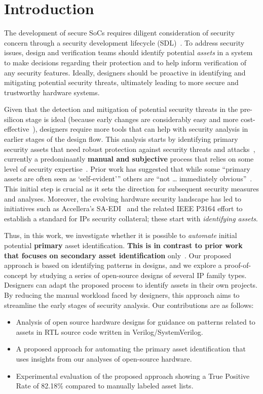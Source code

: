 \section{Introduction}

The development of secure \acp{SoC} requires diligent consideration of security concern through a security development lifecycle (SDL)~\cite{Khattri_HSDL_2012}. 
To address security issues, design and verification teams should identify potential \textit{assets} in a system to make decisions regarding their protection and to help inform verification of any security features. 
Ideally, designers should be proactive in identifying and mitigating potential security threats, ultimately leading to more secure and trustworthy hardware systems.

Given that the detection and mitigation of potential security threats in the pre-silicon stage is ideal (because early changes are considerably easy and more cost-effective~\cite{Ahmad_2022}), designers require more tools that can help with security analysis in earlier stages of the design flow. 
This analysis starts by identifying primary security assets that need robust protection against security threats and attacks~\cite{mishra_hardware_2017}, currently a predominantly\textbf{ manual and subjective} process that relies on some level of security expertise~\cite{ieee_p3164_working_group_asset_2024}. Prior work has suggested that while some ``primary assets are often seen as `self-evident''' others are ``not \ldots{} immediately obvious''~\cite{Ayalasomayajula_Automatic_2024}. 
This initial step is crucial as it sets the direction for subsequent security measures and analyses.
Moreover, the evolving hardware security landscape has led to initiatives such as Accellera's \ac{SA-EDI}~\cite{accellera} and the related IEEE P3164 effort to establish a standard for \acp{IP} security collateral; these start with \textit{identifying assets}. 

Thus, in this work, we investigate whether it is possible to \textit{automate} initial potential \textbf{primary} asset identification. 
\textbf{This is in contrast to prior work that focuses on secondary asset identification} only~\cite{farzana_saif_2021,Ayalasomayajula_Automatic_2024}. 
Our proposed approach is based on identifying patterns in designs, and we explore a proof-of-concept by studying a series of open-source designs of several IP family types. 
Designers can adapt the proposed process to identify assets in their own projects. 
By reducing the manual workload faced by designers, this approach aims to streamline the early stages of security analysis. 
Our contributions are as follows:
\begin{itemize}
    \item Analysis of open source hardware designs for guidance on patterns related to assets in \ac{RTL} source code written in Verilog/SystemVerilog.
    \item A proposed approach for automating the primary asset identification that uses insights from our analyses of open-source hardware.
    \item Experimental evaluation of the proposed approach showing a True Positive Rate of 82.18\% compared to manually labeled asset lists.
\end{itemize}
